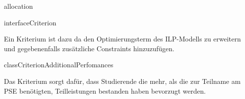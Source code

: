 \begin{texdocpackage}{allocation}
\begin{texdocclass}{interface}{Criterion}
\label{texdoclet:allocation.Criterion}
\begin{texdocclassintro}
Ein Kriterium ist dazu da den Optimierungsterm des ILP-Modells zu erweitern und gegebenenfalls zusätzliche Constraints hinzuzufügen.\end{texdocclassintro}
\begin{texdocclassmethods}
\end{texdocclassmethods}
\end{texdocclass}


\begin{texdocclass}{class}{CriterionAdditionalPerfomances}
\label{texdoclet:allocation.CriterionAdditionalPerfomances}
\begin{texdocclassintro}
Das Kriterium sorgt dafür, dass Studierende die mehr, als die zur Teilname am
 PSE benötigten, Teilleistungen bestanden haben bevorzugt werden.\end{texdocclassintro}
\begin{texdocclassconstructors}
\end{texdocclassconstructors}
\begin{texdocclassmethods}
\end{texdocclassmethods}
\end{texdocclass}



\end{texdocpackage}
